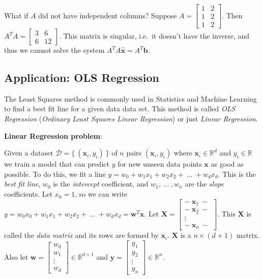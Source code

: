 \documentclass{acm_proc_article-sp}
\begin{document}
What if \(A\) did not have independent columns? Suppose \(A = \begin{bmatrix} 1 & 2 \\ 1 & 2 \\ 1 & 2 \end{bmatrix}\). Then \(A^T A = \begin{bmatrix} 3 & 6 \\ 6 & 12 \end{bmatrix}\). This
matrix is singular, i.e.~it doesn't have the inverse, and thus we cannot
solve the system \(A^T A \hat {\mathbf x} = A^T \mathbf b\).


\subsection{Application: OLS Regression}

The Least Squares method is commonly used in Statistics and Machine Learning to find
a best fit line for a given data data set. This method is called
\emph{OLS Regression} (\emph{Ordinary Least Squares Linear Regression})
or just \emph{Linear Regression}.

\textbf{Linear Regression problem}:

Given a dataset \(\mathcal D = \{ \ (\mathbf x_i, y_i) \ \}\) of \(n\) pairs \((\mathbf x_i, y_i)\) where \(\mathbf x_i \in \mathbb R^d\) and
\(y_i \in \mathbb R\) we train a model that can predict \(y\) for new unseen data points \(\mathbf x\) as good as possible. To do this, we fit a line \(y = w_0 + w_1 x_1 + w_2 x_2 + \ ... \ + w_d x_d\).
This is the \emph{best fit line}, \(w_0\) is the \emph{intercept} coefficient, and
\(w_1, \ ... \ , w_n\) are the \emph{slope} coefficients. Let \(x_0 = 1\), so we can write \(y = w_0 x_0 + w_1 x_1 + w_2 x_2 + \ ... \ + w_d x_d = \mathbf w^T \mathbf x\).
Let \(\mathbf X = \begin{bmatrix} - \ \mathbf x_1 \ - \\ - \ \mathbf x_2 \ - \\ \vdots \\ - \ \mathbf x_n \ - \end{bmatrix}\). This \(\mathbf X\) is called the \emph{data matrix} and its rows are formed by \(\mathbf x_i\). \(\mathbf X\) is a \(n \times (d + 1)\) matrix. Also let \(\mathbf w = \begin{bmatrix} w_0 \\ w_1 \\ \vdots \\ w_d \end{bmatrix} \in \mathbb R^{d+1}\) and
\(\mathbf y = \begin{bmatrix} y_1 \\ y_2 \\ \vdots \\ y_n \end{bmatrix} \in \mathbb R^n\).
\end{document}
